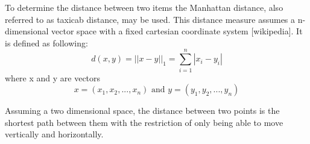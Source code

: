 To determine the distance between two items the Manhattan distance, also referred to as taxicab distance, may be used. This distance measure assumes a n-dimensional vector space with a fixed cartesian coordinate system [wikipedia]. It is defined as following:
$$d(x,y)= ||x-y||_1 = \sum\limits_{i=1}^{n}|x_i - y_i|$$
where x and y are vectors
$$x = (x_1, x_2,..., x_n) \text{ and } y = (y_1, y_2,..., y_n)$$

Assuming a two dimensional space, the distance between two points is the shortest path between them with the restriction of only being able to move vertically and horizontally.